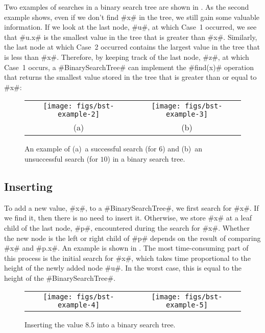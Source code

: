 Two examples of searches in a binary search tree are shown in
.  As the second example shows, even if we don't find #x#
in the tree, we still gain some valuable information.  If we look at
the last node, #u#, at which Case~1 occurred, we see that #u.x# is the smallest
value in the tree that is greater than #x#.  Similarly, the last node
at which Case~2 occurred contains the largest value in the tree that is
less than #x#.  Therefore, by keeping track of the last node, #z#,
at which Case~1 occurs, a #BinarySearchTree# can implement the #find(x)#
operation that returns the smallest value stored in the tree that is
greater than or equal to #x#:

\begin{figure}
  \begin{center}
    \begin{tabular}{cc}
    \texttt{[image: figs/bst-example-2]} &
    \texttt{[image: figs/bst-example-3]} \\
    (a) & (b)
    \end{tabular}
  \end{center}
  \caption{An example of (a)~a successful search (for $6$) and (b)~an unsuccessful search (for $10$) in a binary search tree.}
\end{figure}


\subsection{Inserting}

To add a new value, #x#, to a #BinarySearchTree#, we first search for
#x#. If we find it, then there is no need to insert it.  Otherwise,
we store #x# at a leaf child of the last node, #p#, encountered during the
search for #x#. Whether the new node is the left or right child of #p# depends on the result of comparing #x# and #p.x#.
An example is shown in . The most time-consuming
part of this process is the initial search for #x#, which takes time
proportional to the height of the newly added node #u#.  In the worst
case, this is equal to the height of the #BinarySearchTree#.

\begin{figure}
  \begin{center}
    \begin{tabular}{cc}
    \texttt{[image: figs/bst-example-4]} &
    \texttt{[image: figs/bst-example-5]} 
    \end{tabular}
  \end{center}
  \caption{Inserting the value $8.5$ into a binary search tree.}
\end{figure}



